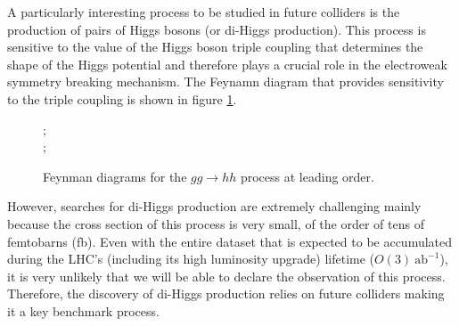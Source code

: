 A particularly interesting process to be studied in future colliders is the production of pairs of Higgs bosons (or di-Higgs production). This process is sensitive to the value of the Higgs boson triple coupling that determines the shape of the Higgs potential and therefore plays a crucial role in the electroweak symmetry breaking mechanism. The Feynamn diagram that provides sensitivity to the triple coupling is shown in figure \ref{fig:hh_diag}.

\begin{figure}[h]
	\centering
	;\\
	;
	\label{fig:hh_diag}
	\caption{Feynman diagrams for the $gg\rightarrow hh$ process at leading order.}
\end{figure}

However, searches for di-Higgs production are extremely challenging mainly because the cross section of this process is very small, of the order of tens of femtobarns (fb). Even with the entire dataset that is expected to be accumulated during the LHC's (including its high luminosity upgrade) lifetime ($O(3)~\text{ab}^{-1}$), it is very unlikely that we will be able to declare the observation of this process. Therefore, the discovery of di-Higgs production relies on future colliders making it a key benchmark process.

